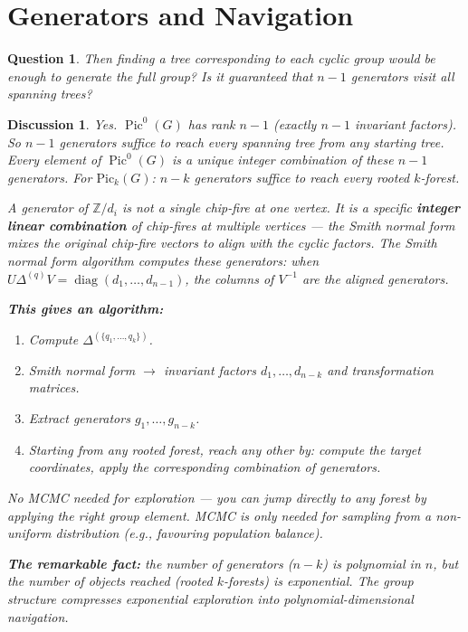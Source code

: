 \documentclass[11pt]{article}
\newcommand{\Z}{\mathbb{Z}}
\newcommand{\Pic}{\operatorname{Pic}^0}
\newtheorem{question}{Question}
\newtheorem{answer}{Discussion}
\begin{document}
\section{Generators and Navigation}

\begin{question}
Then finding a tree corresponding to each cyclic group would be enough to
generate the full group? Is it guaranteed that $n-1$ generators visit all
spanning trees?
\end{question}

\begin{answer}
Yes. $\Pic(G)$ has rank $n-1$ (exactly $n-1$ invariant factors). So $n-1$
generators suffice to reach every spanning tree from any starting tree. Every
element of $\Pic(G)$ is a unique integer combination of these $n-1$
generators. For $\mathrm{Pic}_k(G)$: $n-k$ generators suffice to reach every
rooted $k$-forest.

A generator of $\Z/d_i$ is not a single chip-fire at one vertex. It is a
specific \textbf{integer linear combination} of chip-fires at multiple
vertices --- the Smith normal form mixes the original chip-fire vectors to
align with the cyclic factors. The Smith normal form algorithm computes these
generators: when $U \Delta^{(q)} V = \operatorname{diag}(d_1, \ldots, d_{n-1})$,
the columns of $V^{-1}$ are the aligned generators.

\textbf{This gives an algorithm:}
\begin{enumerate}
  \item Compute $\Delta^{(\{q_1,\ldots,q_k\})}$.
  \item Smith normal form $\to$ invariant factors $d_1, \ldots, d_{n-k}$ and
    transformation matrices.
  \item Extract generators $g_1, \ldots, g_{n-k}$.
  \item Starting from any rooted forest, reach any other by: compute the target
    coordinates, apply the corresponding combination of generators.
\end{enumerate}

No MCMC needed for exploration --- you can jump directly to any forest by
applying the right group element. MCMC is only needed for sampling from a
non-uniform distribution (e.g., favouring population balance).

\textbf{The remarkable fact:} the number of generators ($n-k$) is polynomial
in $n$, but the number of objects reached (rooted $k$-forests) is exponential.
The group structure compresses exponential exploration into
polynomial-dimensional navigation.
\end{answer}
\end{document}
